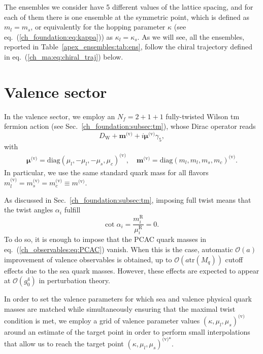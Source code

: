 The ensembles we consider have 5 different values of the lattice spacing, and for each of them there is one ensemble at the symmetric point, which is defined as $m_l=m_s$, or equivalently for the hopping parameter $\kappa$ (see eq.~(\ref{ch_foundation:eq:kappa})) as $\kappa_l=\kappa_s$. As we will see, all the ensembles, reported in Table~\ref{apex_ensembles:tab:ens}, follow the chiral trajectory defined in eq.~(\ref{ch_ma:eq:chiral_traj}) below.




\section{Valence sector}
\label{ch_ma:sec:Valence}

In the valence sector, we employ an $N_f=2+1+1$ fully-twisted Wilson tm fermion action (see Sec.~\ref{ch_foundation:subsec:tm}), whose Dirac operator reads
\begin{equation}
D_{\textrm{W}}+\boldsymbol{m}^{\textrm{(v)}}+i\boldsymbol{\mu}^{\textrm{(v)}}\gamma_5,
\end{equation}
with 
\begin{gather}
\boldsymbol{\mu}^{\textrm{(v)}}={\textrm{diag}}(\mu_l,-\mu_l,-\mu_s,\mu_c)^{\textrm{(v)}}, \quad
\boldsymbol{m}^{\textrm{(v)}}={\textrm{diag}}(m_l,m_l,m_s,m_c)^{\textrm{(v)}}.
\end{gather}
In particular, we use the same standard quark mass for all flavors $m_l^{\textrm{(v)}}=m_s^{\textrm{(v)}}=m_c^{\textrm{(v)}}\equiv m^{\textrm{(v)}}$.

As discussed in Sec.~\ref{ch_foundation:subsec:tm}, imposing full twist means that the twist angles $\alpha_i$ fulfill
\begin{equation}
{\textrm{cot}}\;\alpha_i=\frac{m_i^{\textrm{R}}}{\mu_i^{\textrm{R}}}=0.
\end{equation}
To do so, it is enough to impose that the PCAC quark masses in eq.~(\ref{ch_observables:eq:PCAC}) vanish. When this is the case, automatic $\mathcal{O}(a)$ improvement of valence observables is obtained, up to $\mathcal{O}(a\textrm{tr}\left(M_q\right))$ cutoff effects due to the sea quark masses. However, these effects are expected to appear at $\mathcal{O}(g_0^4)$ in perturbation theory.

In order to set the valence parameters for which sea and valence physical quark masses are matched  while simultaneously ensuring that the maximal twist condition is met, we employ a grid of valence parameter values $\left(\kappa,\mu_l,\mu_s\right)^{\textrm{(v)}}$ around an estimate of the target point in order to perform small interpolations that allow us to reach the target point $\left(\kappa,\mu_l,\mu_s\right)^{\textrm{(v)*}}$.

